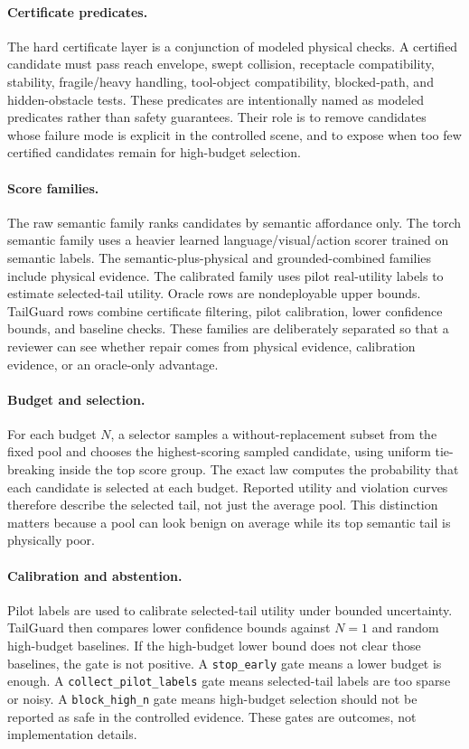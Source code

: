 \documentclass{article}
\begin{document}
\paragraph{Certificate predicates.}
The hard certificate layer is a conjunction of modeled physical checks. A certified candidate must pass reach envelope, swept collision, receptacle compatibility, stability, fragile/heavy handling, tool-object compatibility, blocked-path, and hidden-obstacle tests. These predicates are intentionally named as modeled predicates rather than safety guarantees. Their role is to remove candidates whose failure mode is explicit in the controlled scene, and to expose when too few certified candidates remain for high-budget selection.

\paragraph{Score families.}
The raw semantic family ranks candidates by semantic affordance only. The torch semantic family uses a heavier learned language/visual/action scorer trained on semantic labels. The semantic-plus-physical and grounded-combined families include physical evidence. The calibrated family uses pilot real-utility labels to estimate selected-tail utility. Oracle rows are nondeployable upper bounds. TailGuard rows combine certificate filtering, pilot calibration, lower confidence bounds, and baseline checks. These families are deliberately separated so that a reviewer can see whether repair comes from physical evidence, calibration evidence, or an oracle-only advantage.

\paragraph{Budget and selection.}
For each budget $N$, a selector samples a without-replacement subset from the fixed pool and chooses the highest-scoring sampled candidate, using uniform tie-breaking inside the top score group. The exact law computes the probability that each candidate is selected at each budget. Reported utility and violation curves therefore describe the selected tail, not just the average pool. This distinction matters because a pool can look benign on average while its top semantic tail is physically poor.

\paragraph{Calibration and abstention.}
Pilot labels are used to calibrate selected-tail utility under bounded uncertainty. TailGuard then compares lower confidence bounds against $N=1$ and random high-budget baselines. If the high-budget lower bound does not clear those baselines, the gate is not positive. A \texttt{stop\_early} gate means a lower budget is enough. A \texttt{collect\_pilot\_labels} gate means selected-tail labels are too sparse or noisy. A \texttt{block\_high\_n} gate means high-budget selection should not be reported as safe in the controlled evidence. These gates are outcomes, not implementation details.
\end{document}
